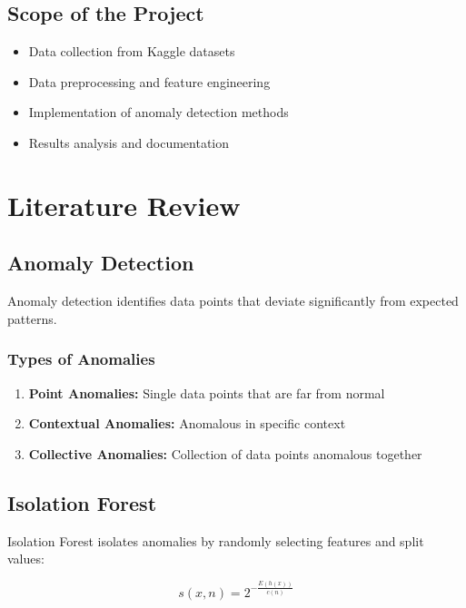 \documentclass[12pt,a4paper]{report}
\begin{document}
\section{Scope of the Project}
\begin{itemize}
    \item Data collection from Kaggle datasets
    \item Data preprocessing and feature engineering
    \item Implementation of anomaly detection methods
    \item Results analysis and documentation
\end{itemize}

\chapter{Literature Review}

\section{Anomaly Detection}
Anomaly detection identifies data points that deviate significantly from expected patterns.

\subsection{Types of Anomalies}
\begin{enumerate}
    \item \textbf{Point Anomalies:} Single data points that are far from normal
    \item \textbf{Contextual Anomalies:} Anomalous in specific context
    \item \textbf{Collective Anomalies:} Collection of data points anomalous together
\end{enumerate}

\section{Isolation Forest}
Isolation Forest isolates anomalies by randomly selecting features and split values:

\begin{equation}
s(x, n) = 2^{-\frac{E(h(x))}{c(n)}}
\end{equation}
\end{document}
